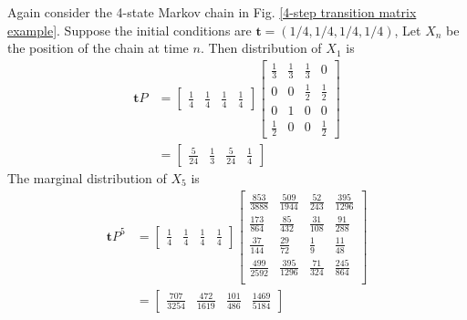 \begin{example}
    Again consider the 4-state Markov chain in Fig. \ref{4-step transition matrix example}. 
    Suppose the initial conditions are $ \mathbf{t} = (1/4,1/4,1/4,1/4) $, Let $ X_{n} $ be the position of the chain at time $ n $. 
    Then distribution of  $ X_{1} $ is
    \begin{align*}
        \mathbf{t}P &= \begin{bmatrix} \frac{1}{4} & \frac{1}{4} & \frac{1}{4} & \frac{1}{4} \end{bmatrix} 
        \begin{bmatrix}
            \frac{1}{3} & \frac{1}{3} & \frac{1}{3} & 0 \\
            0 & 0 & \frac{1}{2} & \frac{1}{2} \\ 
            0 & 1 & 0 & 0 \\ 
            \frac{1}{2} & 0 & 0 & \frac{1}{2} 
        \end{bmatrix}\\
                    &= \begin{bmatrix} \frac{5}{24} & \frac{1}{3} & \frac{5}{24} & \frac{1}{4} \end{bmatrix} 
    \end{align*}
    The marginal distribution of $ X_{5} $ is 
    \begin{align*}
        \mathbf{t}P^{5} &= \begin{bmatrix} \frac{1}{4} & \frac{1}{4} & \frac{1}{4} & \frac{1}{4} \end{bmatrix}
        \begin{bmatrix}
            \frac{853}{3888} & \frac{509}{1944} & \frac{52}{243} & \frac{395}{1296} \\
            \frac{173}{864} & \frac{85}{432} & \frac{31}{108} & \frac{91}{288} \\
            \frac{37}{144} & \frac{29}{72} & \frac{1}{9} & \frac{11}{48} \\
            \frac{499}{2592} & \frac{395}{1296} & \frac{71}{324} & \frac{245}{864} \\
        \end{bmatrix}\\
                        &= \begin{bmatrix}
                            \frac{707}{3254} & \frac{472}{1619} & \frac{101}{486} & \frac{1469}{5184}
                        \end{bmatrix} \\
    \end{align*}
\end{example}
